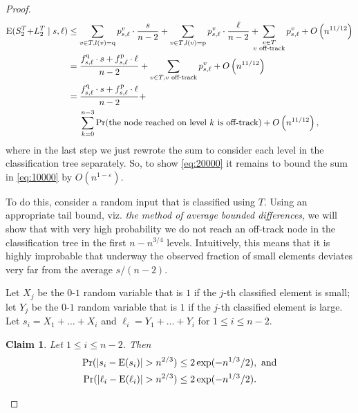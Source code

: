 \documentclass[prodmode,acmtalg]{acmsmall}
\newcommand{\E}{\textnormal{\textrm{E}}}
\newtheorem{claim}[theorem]{Claim}
\begin{document}
\begin{proof}
\begin{align}\label{eq:10000}
 \E(S_2^T {+} L_2^T \mid s, \ell) &\leq \sum_{v \in T, l(v) = \text{q}}
	p^v_{s,\ell}\cdot\frac{s}{n
	- 2}+ \sum_{v \in T, l(v) = \text{p}} p^v_{s,\ell}\cdot
        \frac{\ell}{n - 2} + \!\!\!\!\!  
	\sum_{\substack{v \in T\\v \text{ off-track}}} p^v_{s,\ell} + O\left(n^{11/12}\right) \notag\\
    &= \frac{f^{\text{q}}_{s,\ell} \cdot s + f^{\text{p}}_{s,\ell} \cdot
\ell}{n-2}  + \sum_{v \in T,
	v \text{ off-track}} p^v_{s, \ell} + O\left(n^{11/12}\right)\notag\\
 &= \frac{f^{\text{q}}_{s,\ell} \cdot s + f^{\text{p}}_{s,\ell} \cdot
\ell}{n-2} + \notag \\ &\,\,\quad\sum_{k = 0}^{n-3} \Pr(\text{the node reached on level $k$ is off-track}) + O\left(n^{11/12}\right),
\end{align}
where in the last step we just rewrote the sum to consider each level in the classification
tree separately.
So, to show \eqref{eq:20000} it  remains to
bound the sum in \eqref{eq:10000} by $O(n^{1-\varepsilon})$. 

To do this, consider a random input that is classified using $T$.
Using an appropriate tail bound, viz. \emph{the method of average bounded differences},  
we will show that with very high probability we do not reach an off-track node in the
classification tree in the first $n - n^{3/4}$ levels. Intuitively, this means 
that it is highly improbable that underway the observed fraction of small elements 
deviates very far from the average $s/(n-2)$. 

Let $X_j$ be the $0$-$1$ random variable that is
$1$
if the $j$-th classified element is small; let $Y_j$ be the $0$-$1$ random
variable that is $1$ if the $j$-th classified element is large. Let $s_i =
X_1 + \dots + X_i$ and $\ell_i = Y_1 + \dots + Y_i$ for $1 \leq i \leq n - 2$.

\begin{claim}
    Let $1 \leq i \leq n - 2$. Then 
    \begin{align*}
	\Pr(|s_i - \E(s_i)| &> n^{2/3}) \leq 2\exp(-n^{1/3}/2), \text{ and}\\
	\Pr(|\ell_i - \E(\ell_i)| &> n^{2/3}) \leq 2\exp(-n^{1/3}/2).
    \end{align*}
\end{claim}


\end{proof}
\end{document}

